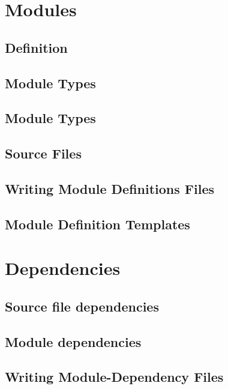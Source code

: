 \documentclass[a4paper]{book}
\begin{document}

\chapter{Modules}

\section{Definition}
\section{Module Types}
\section{Module Types}
\section{Source Files}
\section{Writing Module Definitions Files}
\section{Module Definition Templates}


\chapter{Dependencies}

\section{Source file dependencies}
\section{Module dependencies}
\section{Writing Module-Dependency Files}

\end{document}
